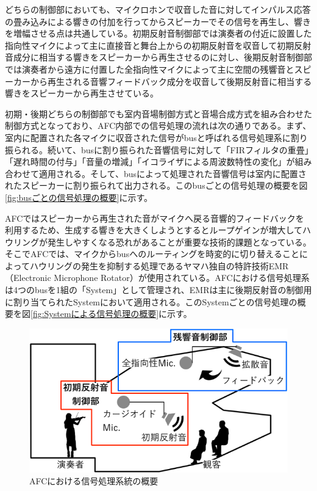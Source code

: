 \documentclass[11pt,a4j]{jreport}
\begin{document}
どちらの制御部においても、マイクロホンで収音した音に対してインパルス応答の畳み込みによる響きの付加を行ってからスピーカーでその信号を再生し、響きを増幅させる点は共通している。初期反射音制御部では演奏者の付近に設置した指向性マイクによって主に直接音と舞台上からの初期反射音を収音して初期反射音成分に相当する響きをスピーカーから再生させるのに対し、後期反射音制御部では演奏者から遠方に付置した全指向性マイクによって主に空間の残響音とスピーカーから再生される音響フィードバック成分を収音して後期反射音に相当する響きをスピーカーから再生させている。

初期・後期どちらの制御部でも室内音場制御方式と音場合成方式を組み合わせた制御方式となっており、AFC内部での信号処理の流れは次の通りである。まず、室内に配置された各マイクに収音された信号がbusと呼ばれる信号処理系に割り振られる。続いて、busに割り振られた音響信号に対して「FIRフィルタの重畳」「遅れ時間の付与」「音量の増減」「イコライザによる周波数特性の変化」が組み合わせて適用される。そして、busによって処理された音響信号は室内に配置されたスピーカーに割り振られて出力される。このbusごとの信号処理の概要を図\ref{fig:busごとの信号処理の概要}に示す。

AFCではスピーカーから再生された音がマイクへ戻る音響的フィードバックを利用するため、生成する響きを大きくしようとするとループゲインが増大してハウリングが発生しやすくなる恐れがあることが重要な技術的課題となっている。そこでAFCでは、マイクからbusへのルーティングを時変的に切り替えることによってハウリングの発生を抑制する処理であるヤマハ独自の特許技術EMR（Electronic Microphone Rotator）\cite{清水1996EMR}が使用されている。AFCにおける信号処理系は4つのbusを1組の「System」として管理され、EMRは主に後期反射音の制御用に割り当てられたSystemにおいて適用される。このSystemごとの信号処理の概要を図\ref{fig:Systemによる信号処理の概要}に示す。


\begin{figure}[H]
  \centering
  \includegraphics[width=0.8\linewidth]{images/AFCsystemOverView.png}
  \caption{AFCにおける信号処理系統の概要}
  \label{fig:AFCにおける信号処理の概要}
\end{figure}
\end{document}
